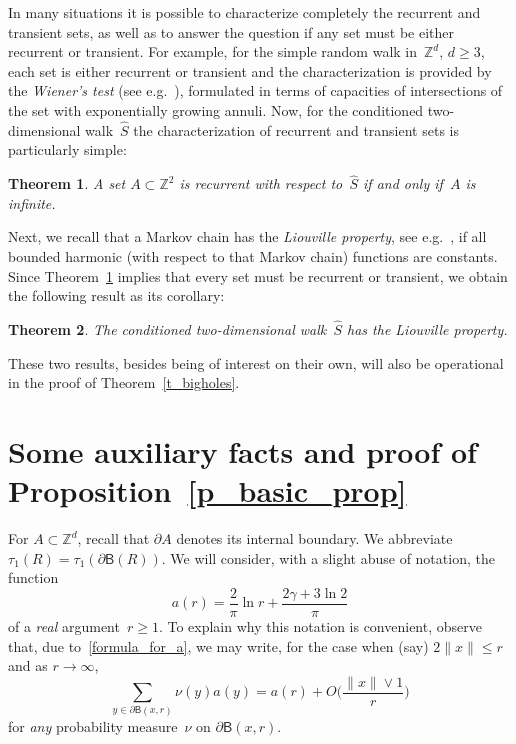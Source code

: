 \documentclass[11pt]{article}
\newtheorem{theo}{Theorem}[section]
\theoremstyle{definition}
\numberwithin{equation}{section}
\numberwithin{figure}{section}
\numberwithin{table}{section}
\newcommand{\1}[1]{{\mathbf 1}{\{#1\}}}
\newcommand{\Z}{\mathbb{Z}}
\newcommand{\s}{{\widehat S}}
\newcommand{\8}{{\infty}}
\newcommand{\B}{{\mathsf B}}
\begin{document}
In many situations it is possible to characterize completely the recurrent and transient sets, as well as to answer the question if any set must be either recurrent or transient. For example, for the simple random walk in~$\Z^d$, $d\geq 3$, each set is either recurrent or transient and the characterization is provided by the \emph{Wiener's test} (see e.g.~\cite[Corollary~6.5.9]{LL10}), formulated in terms of capacities of intersections of the set with exponentially growing annuli. Now, for the conditioned two-dimensional walk~$\s$ the characterization of recurrent and transient sets is particularly simple:

\begin{theo}\label{t_rec_trans}
A set $A\subset\Z^2$ is recurrent with respect to~$\s$ if and only if~$A$ is infinite.
\end{theo}

Next, we recall that a Markov chain has the \emph{Liouville property}, see e.g.~\cite[Chapter~IV]{Woess09}, if all bounded harmonic (with respect to that Markov chain) functions are constants. Since Theorem~\ref{t_rec_trans} implies that every set must be recurrent or transient, we obtain the following result as its corollary:

\begin{theo}\label{t_Liouville}
The conditioned two-dimensional walk~$\s$ has the Liouville property.
\end{theo}

These two results, besides being of interest on their own, will also be operational in the proof of Theorem~\ref{t_bigholes}.



\section{Some auxiliary facts and proof of Proposition~\ref{p_basic_prop}}\label{s_aux}

For $A\subset \Z^d$, recall that $\partial A$ denotes its internal boundary. We abbreviate $\tau_1(R) = \tau_1(\partial \B(R)).$ We will consider, with a slight abuse of notation, the function
\[
a(r)=\frac{2}{\pi}\ln r + \frac{2\gamma+ 3\ln 2}{\pi}
\]
of a \emph{real} argument~$r\geq 1$. To explain why this notation is convenient, observe that, due to~\eqref{formula_for_a}, we may write, for the case when (say) $2\|x\|\leq r$ and as $r\to\infty$,
\begin{equation}\label{real_a}
\sum_{y\in\partial \B(x,r)} \nu(y)a(y) = a(r) + O\Big(\frac{\|x\|\vee 1}{r}\Big)
\end{equation}
for \emph{any} probability measure~$\nu$ on $\partial \B(x,r)$.
\end{document}
